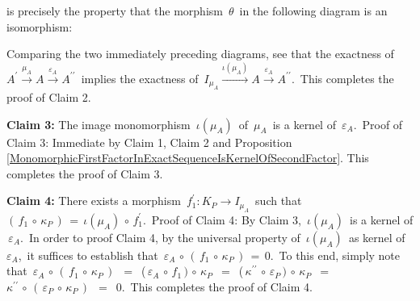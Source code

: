 \begin{enumerate}
	is precisely the property that the morphism \,$\theta$\, in the following diagram is an isomorphism:
	\begin{center}
	\end{center}
	Comparing the two immediately preceding diagrams,
	see that the exactness of
	\,$A^{\prime} \overset{\mu_{A}}{\longrightarrow} A \overset{\varepsilon_{A}}{\longrightarrow} A^{\prime\prime}$\,
	implies the exactness of
	\,$I_{\mu_{A}} \overset{\iota(\mu_{A})}{\longrightarrow} A \overset{\varepsilon_{A}}{\longrightarrow} A^{\prime\prime}$.\,
	This completes the proof of Claim 2.	


	\vskip 0.3cm
	\textbf{Claim 3:}\;
	The image monomorphism \,$\iota(\mu_{A})$\, of \,$\mu_{A}$\, is a kernel of \,$\varepsilon_{A}$.\,
	\vskip 0.01cm
	Proof of Claim 3:\;
	Immediate by Claim 1, Claim 2 and
	Proposition \ref{MonomorphicFirstFactorInExactSequenceIsKernelOfSecondFactor}.
	This completes the proof of Claim 3.

	\vskip 0.3cm
	\textbf{Claim 4:}\;
	There exists a morphism
	\,$f_{1}^{\prime} : K_{P} \longrightarrow I_{\mu_{A}}$\,
	such that
	\,$(\,f_{1} \,\circ\, \kappa_{P}\,) \,=\, \iota(\mu_{A}) \,\circ\, f_{1}^{\prime}$.\,
	\vskip 0.01cm
	Proof of Claim 4:\;
	By Claim 3, \,$\iota(\mu_{A})$\, is a kernel of \,$\varepsilon_{A}$.\,
	In order to proof Claim 4, by the universal property of
	\,$\iota(\mu_{A})$\, as kernel of \,$\varepsilon_{A}$,\,
	it suffices to establish that
	\,$\varepsilon_{A} \,\circ\, (\,f_{1} \,\circ\, \kappa_{P}\,) \,=\, 0$.\,
	To this end, simply note that
	\,$\varepsilon_{A} \,\circ\, (\,f_{1} \,\circ\, \kappa_{P}\,)$
	\,$=$\, (\,$\varepsilon_{A} \,\circ\, f_{1}\,) \,\circ\, \kappa_{P}$
	\,$=$\, (\,$\kappa^{\prime\prime} \,\circ\, \varepsilon_{P}\,) \,\circ\, \kappa_{P}$
	\,$=$\, $\kappa^{\prime\prime} \,\circ\, (\,\varepsilon_{P} \,\circ\, \kappa_{P}\,)$
	\,$=$\, $0$.\,
	This completes the proof of Claim 4.



\end{enumerate}
